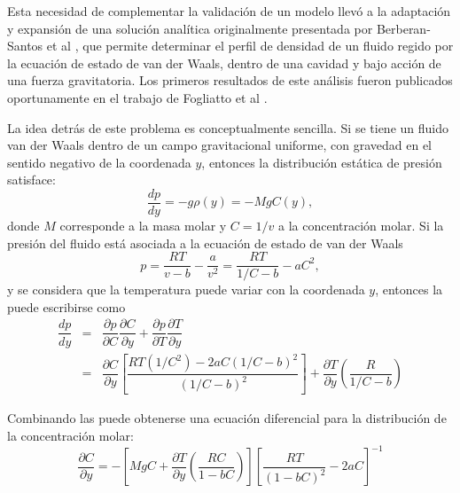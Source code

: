 Esta necesidad de complementar la validaci\'on de un modelo \pp{} llev\'o a la adaptaci\'on y expansi\'on de una soluci\'on anal\'itica originalmente presentada por Berberan-Santos et al \cite{berberan-santos_liquidvapor_2002}, que permite determinar el perfil de densidad de un fluido regido por la ecuaci\'on de estado de van der Waals, dentro de una cavidad y bajo acci\'on de una fuerza gravitatoria.  Los primeros resultados de este an\'alisis fueron publicados oportunamente en el trabajo de Fogliatto et al \cite{fogliatto_simulation_2019}.

La idea detr\'as de este problema es conceptualmente sencilla. Si se tiene un fluido van der Waals dentro de un campo gravitacional uniforme, con gravedad en el sentido negativo de la coordenada $y$, entonces la distribuci\'on est\'atica de presi\'on satisface:
\begin{equation}
	\dfrac{dp}{dy} = -g\rho(y) = -MgC(y),
	\label{eq:p_hidrost}
\end{equation}
donde $M$ corresponde a la masa molar y $C=1/v$ a la concentraci\'on molar. Si la presi\'on del fluido est\'a asociada a la ecuaci\'on de estado de van der Waals
\begin{equation}
	p = \dfrac{RT}{v-b} - \dfrac{a}{v^2} = \dfrac{RT}{1/C-b} - aC^2,
\end{equation}
y se considera que la temperatura puede variar con la coordenada $y$, entonces la  puede escribirse como
\begin{equation}
	\begin{array}{rcl}
		\dfrac{dp}{dy} &=& \dfrac{\partial p }{\partial C} \dfrac{\partial C}{\partial y}	 + \dfrac{\partial p}{\partial T}\dfrac{\partial T}{\partial y} \\[3mm]
		&=& \dfrac{\partial C}{\partial y}\left[ \dfrac{RT(1/C^2)- 2aC(1/C-b)^2}{(1/C-b)^2} \right] + \dfrac{\partial T}{\partial y}\left( \dfrac{R}{1/C-b}\right)
	\end{array}
	\label{eq:partial_p}
\end{equation}

Combinando las  puede obtenerse una ecuaci\'on diferencial para la distribuci\'on de la concentraci\'on molar:
\begin{equation}
	\dfrac{\partial C}{\partial y} = -\left[ MgC + \dfrac{\partial T}{\partial y}\left( \dfrac{RC}{1-bC} \right) \right] \left[ \dfrac{RT}{(1-bC)^2} -2aC \right]^{-1}
	\label{eq:vdw_molar}
\end{equation} 

